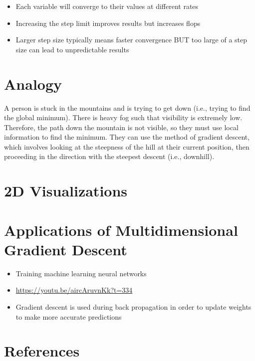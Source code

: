 \documentclass[
]{article}
\providecommand{\tightlist}{%
  \setlength{\itemsep}{0pt}\setlength{\parskip}{0pt}}
\begin{document}
\begin{itemize}
\tightlist
\item
  Each variable will converge to their values at different rates
\item
  Increasing the step limit improves results but increases flops
\item
  Larger step size typically means faster convergence BUT too large of a
  step size can lead to unpredictable results
\end{itemize}

\hypertarget{analogy}{%
\section{Analogy}\label{analogy}}

A person is stuck in the mountains and is trying to get down (i.e.,
trying to find the global minimum). There is heavy fog such that
visibility is extremely low. Therefore, the path down the mountain is
not visible, so they must use local information to find the minimum.
They can use the method of gradient descent, which involves looking at
the steepness of the hill at their current position, then proceeding in
the direction with the steepest descent (i.e., downhill).

\hypertarget{d-visualizations}{%
\section{2D Visualizations}\label{d-visualizations}}

\hypertarget{applications-of-multidimensional-gradient-descent}{%
\section{Applications of Multidimensional Gradient
Descent}\label{applications-of-multidimensional-gradient-descent}}

\begin{itemize}
\tightlist
\item
  Training machine learning neural networks
\item
  \url{https://youtu.be/aircAruvnKk?t=334}
\item
  Gradient descent is used during back propagation in order to update
  weights to make more accurate predictions
\end{itemize}

\hypertarget{references}{%
\section{References}\label{references}}
\end{document}
